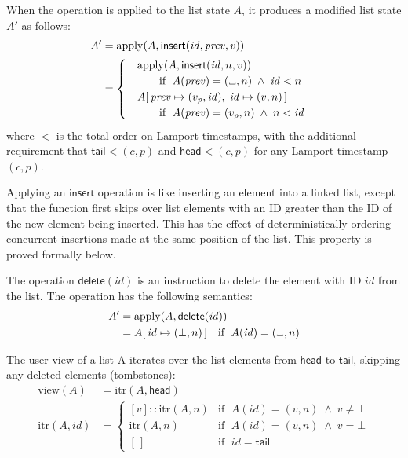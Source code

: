 \documentclass[a4paper,twocolumn,10pt]{article}
\newcommand{\placeholder}{%
  \makebox[0.7em]{%
    \kern.07em
    \vrule height.3ex
    \hrulefill
    \vrule height.3ex
    \kern.07em
  }%
}
\begin{document}
When the operation is applied to the list state $A$, it produces a modified list state $A'$ as follows:
\begin{align*}
A' &= \mathrm{apply}(A, \mathsf{insert}(\mathit{id}, \mathit{prev}, v)) \\ &=
\begin{cases}
\quad \mathrm{apply}(A, \mathsf{insert}(\mathit{id}, n, v)) \\
    \qquad\quad\text{if }\; A(\mathit{prev}) = (\placeholder, n) \;\wedge\; \mathit{id} < n \\
\quad A[\,\mathit{prev} \mapsto (v_p, \mathit{id}),\; \mathit{id} \mapsto (v, n)\,] \\
    \qquad\quad\text{if }\; A(\mathit{prev}) = (v_p, n) \;\wedge\; n < \mathit{id}
\end{cases}
\end{align*}
where $<$ is the total order on Lamport timestamps, with the additional requirement that $\mathsf{tail} < (c, p)$ and $\mathsf{head} < (c, p)$ for any Lamport timestamp $(c, p)$.

Applying an $\mathsf{insert}$ operation is like inserting an element into a linked list, except that the function first skips over list elements with an ID greater than the ID of the new element being inserted. This has the effect of deterministically ordering concurrent insertions made at the same position of the list. This property is proved formally below.

The operation $\mathsf{delete}(\mathit{id})$ is an instruction to delete the element with ID $\mathit{id}$ from the list. The operation has the following semantics:
\begin{align*}
A' &= \mathrm{apply}(A, \mathsf{delete}(\mathit{id})) \\ &=
A[\,\mathit{id} \mapsto (\bot, n)\,]
\quad\text{if }\; A(\mathit{id}) = (\placeholder, n)
\end{align*}

The user view of a list A iterates over the list elements from $\mathsf{head}$ to $\mathsf{tail}$, skipping any deleted elements (tombstones):
\begin{align*}
\mathrm{view}(A) &= \mathrm{itr}(A, \mathsf{head}) \\
\mathrm{itr}(A, \mathit{id}) &= \begin{cases}
    [v] \mathbin{::} \mathrm{itr}(A, n) & \text{if }\; A(\mathit{id}) = (v, n) \;\wedge\; v \neq \bot \\
                     \mathrm{itr}(A, n) & \text{if }\; A(\mathit{id}) = (v, n) \;\wedge\; v = \bot \\
    [\,] & \text{if }\; \mathit{id} = \mathsf{tail}
\end{cases}
\end{align*}
\end{document}
